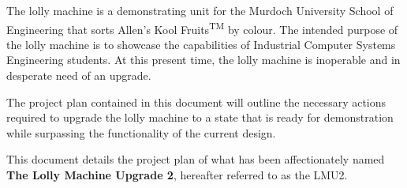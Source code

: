 The lolly machine is a demonstrating unit for the Murdoch University School of Engineering that sorts Allen's Kool Fruits\textsuperscript{TM} by colour. The intended purpose of the lolly machine is to showcase the capabilities of Industrial Computer Systems Engineering students. At this present time, the lolly machine is inoperable and in desperate need of an upgrade. 

The project plan contained in this document will outline the necessary actions required to upgrade the lolly machine to a state that is ready for demonstration while surpassing the functionality of the current design.

This document details the project plan of what has been affectionately named \textbf{The Lolly Machine Upgrade 2}, hereafter referred to as the LMU2.
